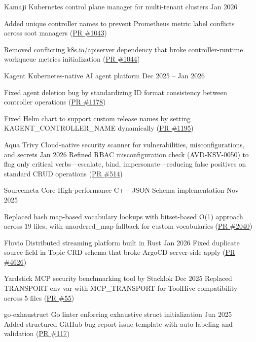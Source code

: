 \ossproject
{Kamaji}
{Kubernetes control plane manager for multi-tenant clusters}
{Jan 2026}
{
\item Added unique controller names to prevent Prometheus metric label conflicts across
      soot managers (\href{https://github.com/clastix/kamaji/pull/1043}{PR \#1043})
\item Removed conflicting k8s.io/apiserver dependency that broke controller-runtime
      workqueue metrics initialization (\href{https://github.com/clastix/kamaji/pull/1044}{PR \#1044})
}

\ossproject
{Kagent}
{Kubernetes-native AI agent platform}
{Dec 2025 -- Jan 2026}
{
\item Fixed agent deletion bug by standardizing ID format consistency between controller
      operations (\href{https://github.com/kagent-dev/kagent/pull/1178}{PR \#1178})
\item Fixed Helm chart to support custom release names by setting KAGENT\_CONTROLLER\_NAME
      dynamically (\href{https://github.com/kagent-dev/kagent/pull/1195}{PR \#1195})
}

\ossprojectsingle
{Aqua Trivy}
{Cloud-native security scanner for vulnerabilities, misconfigurations, and secrets}
{Jan 2026}
{Refined RBAC misconfiguration check (AVD-KSV-0050) to flag only critical verbs---escalate,
bind, impersonate---reducing false positives on standard CRUD operations
(\href{https://github.com/aquasecurity/trivy-checks/pull/514}{PR \#514})}

\pagebreak

\ossproject
{Sourcemeta Core}
{High-performance C++ JSON Schema implementation}
{Nov 2025}
{
\item Replaced hash map-based vocabulary lookups with bitset-based O(1) approach across
      19 files, with unordered\_map fallback for custom vocabularies
      (\href{https://github.com/sourcemeta/core/pull/2040}{PR \#2040})
}

\ossprojectsingle
{Fluvio}
{Distributed streaming platform built in Rust}
{Jan 2026}
{Fixed duplicate source field in Topic CRD schema that broke ArgoCD server-side apply
(\href{https://github.com/fluvio-community/fluvio/pull/4626}{PR \#4626})}

\ossprojectsingle
{Yardstick}
{MCP security benchmarking tool by Stacklok}
{Dec 2025}
{Replaced TRANSPORT env var with MCP\_TRANSPORT for ToolHive compatibility across 5 files
(\href{https://github.com/StacklokLabs/yardstick/pull/55}{PR \#55})}

\ossprojectsingle
{go-exhaustruct}
{Go linter enforcing exhaustive struct initialization}
{Jun 2025}
{Added structured GitHub bug report issue template with auto-labeling and validation
(\href{https://github.com/GaijinEntertainment/go-exhaustruct/pull/117}{PR \#117})}
